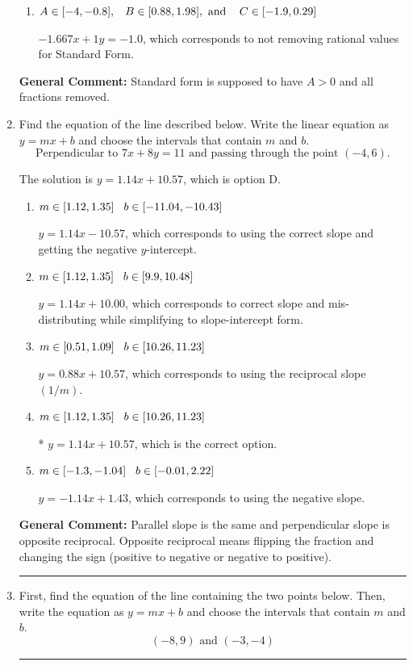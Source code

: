 \documentclass{extbook}[14pt]
\newcommand{\litem}[1]{\item #1

\rule{\textwidth}{0.4pt}}
\begin{document}
\begin{enumerate}
{\begin{enumerate}[label=\Alph*.]
* $5x - 3y = 3$, which is the correct option.
\item \( A \in [-4, -0.8], \hspace{3mm} B \in [0.88, 1.98], \text{ and } \hspace{3mm} C \in [-1.9, 0.29] \)

 $-1.667x + 1y = -1.0$, which corresponds to not removing rational values for Standard Form.
\end{enumerate}

\textbf{General Comment:} Standard form is supposed to have $A > 0$ and all fractions removed.
}
\litem{
Find the equation of the line described below. Write the linear equation as $ y=mx+b $ and choose the intervals that contain $m$ and $b$.
\[ \text{Perpendicular to } 7 x + 8 y = 11 \text{ and passing through the point } (-4, 6). \]

The solution is \( y = 1.14x + 10.57 \), which is option D.\begin{enumerate}[label=\Alph*.]
\item \( m \in [1.12, 1.35] \hspace*{3mm} b \in [-11.04, -10.43] \)

 $y = 1.14x - 10.57$, which corresponds to using the correct slope and getting the negative $y$-intercept.
\item \( m \in [1.12, 1.35] \hspace*{3mm} b \in [9.9, 10.48] \)

 $y = 1.14x + 10.00$, which corresponds to correct slope and mis-distributing while simplifying to slope-intercept form.
\item \( m \in [0.51, 1.09] \hspace*{3mm} b \in [10.26, 11.23] \)

 $y = 0.88x + 10.57$, which corresponds to using the reciprocal slope $(1/m)$.
\item \( m \in [1.12, 1.35] \hspace*{3mm} b \in [10.26, 11.23] \)

* $y = 1.14x + 10.57$, which is the correct option.
\item \( m \in [-1.3, -1.04] \hspace*{3mm} b \in [-0.01, 2.22] \)

 $y = -1.14x + 1.43$, which corresponds to using the negative slope.
\end{enumerate}

\textbf{General Comment:} Parallel slope is the same and perpendicular slope is opposite reciprocal. Opposite reciprocal means flipping the fraction and changing the sign (positive to negative or negative to positive).
}
\litem{
First, find the equation of the line containing the two points below. Then, write the equation as $ y=mx+b $ and choose the intervals that contain $m$ and $b$.
\[ (-8, 9) \text{ and } (-3, -4) \]

}
\end{enumerate}
\end{document}
